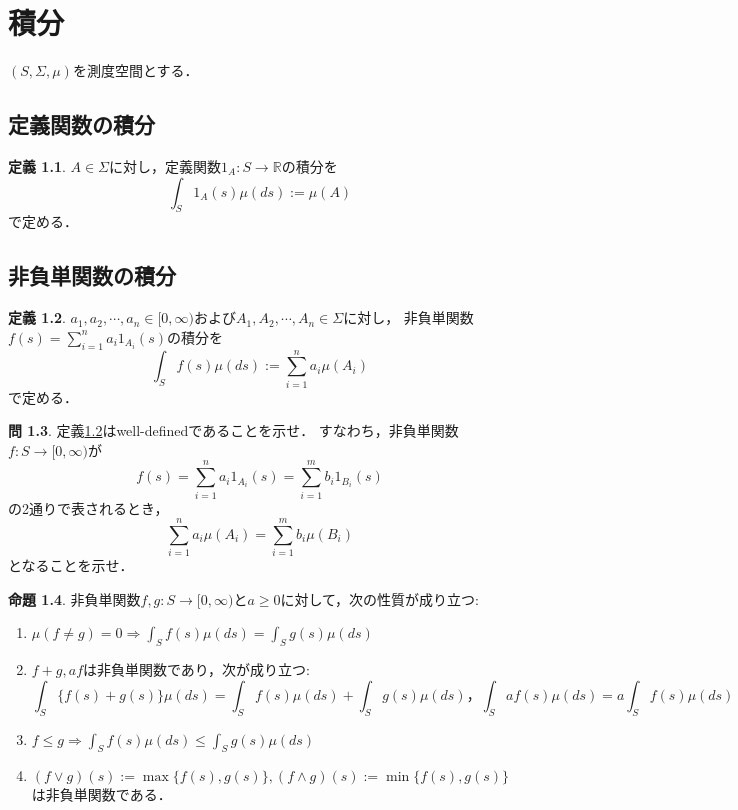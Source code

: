 \documentclass{jsreport}
\theoremstyle{definition}
\newtheorem{defi}{定義}[section]
\newtheorem{prop}[defi]{命題}
\newtheorem{qst}[defi]{問}
\begin{document}
\chapter{積分}

$(S,\Sigma,\mu)$を測度空間とする．

\section{定義関数の積分}

\begin{defi}\label{def_indicator_function_integral}
$A\in\Sigma$に対し，定義関数$1_A \colon S\to\mathbb{R}$の積分を
\[ \int_S 1_A(s)\mu(ds):=\mu(A) \]
で定める．
\end{defi}

\section{非負単関数の積分}

\begin{defi}\label{def_nonnegative_simple_function_integral}
$a_1,a_2,\cdots,a_n\in[0,\infty)$および$A_1,A_2,\cdots,A_n\in\Sigma$に対し，
非負単関数$f(s)=\displaystyle\sum_{i=1}^n a_i1_{A_i}(s)$の積分を
\[ \int_S f(s)\mu(ds):=\sum_{i=1}^n a_i\mu(A_i) \]
で定める．
\end{defi}

\begin{qst}\label{qst_simple_function_integral}
定義\ref{def_nonnegative_simple_function_integral}はwell-definedであることを示せ．
すなわち，非負単関数$f \colon S\to[0,\infty)$が
\[ f(s)=\sum_{i=1}^n a_i1_{A_i}(s)=\sum_{i=1}^m b_i1_{B_i}(s) \]
の2通りで表されるとき，
\[ \sum_{i=1}^n a_i\mu(A_i)=\sum_{i=1}^m b_i\mu(B_i) \]
となることを示せ．
\end{qst}

\begin{prop}\label{prop_properties_of_simple_function_integral}
非負単関数$f,g \colon S\to[0,\infty)$と$a\geq0$に対して，次の性質が成り立つ:
\begin{enumerate}
\item$\mu(f \neq g)=0\Rightarrow\displaystyle\int_S f(s)\mu(ds)=\int_S g(s)\mu(ds)$
\item$f+g, af$は非負単関数であり，次が成り立つ:
\[ \int_S \{f(s)+g(s)\}\mu(ds)=\int_S f(s)\mu(ds)+\int_S g(s)\mu(ds)，
\int_S af(s)\mu(ds)=a\int_S f(s)\mu(ds) \]
\item$f \leq g\Rightarrow\displaystyle\int_S f(s)\mu(ds)\leq\int_S g(s)\mu(ds)$
\item$(f \vee g)(s):=\max\{f(s),g(s)\}, (f \wedge g)(s):=\min\{f(s),g(s)\}$は非負単関数である．
\end{enumerate}
\end{prop}
\end{document}
